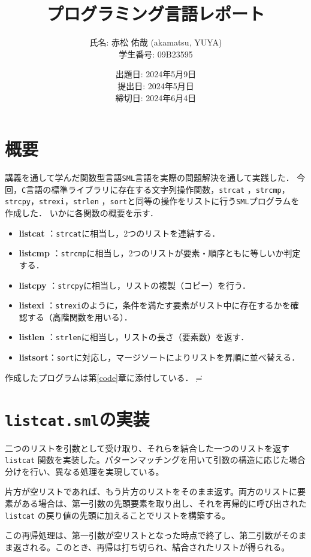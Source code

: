 \documentclass[autodetect-engine,dvi=dvipdfmx,ja=standard,
               a4j,11pt]{bxjsarticle}
\title{プログラミング言語レポート}
\author{氏名: 赤松 佑哉 (akamatsu, YUYA) \\
        学生番号: 09B23595}
\date{出題日: 2024年5月9日 \\
      提出日: 2024年5月日 \\
      締切日: 2024年6月4日 \\}  %
\begin{document}
\maketitle
\section{概要}
講義を通して学んだ関数型言語\verb|SML|言語を実際の問題解決を通して実践した．
今回，\verb|C|言語の標準ライブラリに存在する文字列操作関数，\verb|strcat|
，\verb|strcmp|，\verb|strcpy|，\verb|strexi|，\verb|strlen|
，\verb|sort|と同等の操作をリストに行う\verb|SML|プログラムを作成した．
いかに各関数の概要を示す．
\begin{itemize}
    \item \textbf{listcat} ：\verb|strcat|に相当し，2つのリストを連結する．
    \item \textbf{listcmp} ：\verb|strcmp|に相当し，2つのリストが要素・順序ともに等しいか判定する．
    \item \textbf{listcpy} ：\verb|strcpy|に相当し，リストの複製（コピー）を行う．
    \item \textbf{listexi} ：\verb|strexi|のように，条件を満たす要素がリスト中に存在するかを確認する（高階関数を用いる）．
    \item \textbf{listlen} ：\verb|strlen|に相当し，リストの長さ（要素数）を返す．
    \item \textbf{listsort}：\verb|sort|に対応し，マージソートによりリストを昇順に並べ替える．
\end{itemize}
作成したプログラムは第\ref{code}章に添付している．$\risingdotseq $
\section{\texttt{listcat.sml}の実装}

二つのリストを引数として受け取り、それらを結合した一つのリストを返す \verb|listcat| 関数を実装した。パターンマッチングを用いて引数の構造に応じた場合分けを行い、異なる処理を実現している。

片方が空リストであれば、もう片方のリストをそのまま返す。両方のリストに要素がある場合は、第一引数の先頭要素を取り出し、それを再帰的に呼び出された \verb|listcat| の戻り値の先頭に加えることでリストを構築する。

この再帰処理は、第一引数が空リストとなった時点で終了し、第二引数がそのまま返される。このとき、再帰は打ち切られ、結合されたリストが得られる。
\end{document}
